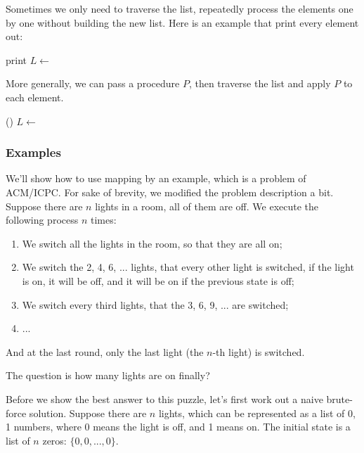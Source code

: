 \documentclass[b5paper]{article}
\begin{document}
Sometimes we only need to traverse the list, repeatedly process the elements one by one without building the new list. Here is an example that print every element out:

\begin{algorithmic}[1]
    \State print 
    \State $L \gets$ 
  \EndWhile
\EndFunction
\end{algorithmic}

More generally, we can pass a procedure $P$, then traverse the list and apply $P$ to each element.

\begin{algorithmic}[1]
    \State {}()
    \State $L \gets$ 
  \EndWhile
\EndFunction
\end{algorithmic}

\subsubsection{Examples}

We'll show how to use mapping by an example, which is a problem of ACM/ICPC\cite{poj-drunk-jailer}.
For sake of brevity, we modified the problem description a bit. Suppose there are $n$ lights in a room, all
of them are off. We execute the following process $n$ times:

\begin{enumerate}
\item We switch all the lights in the room, so that they are all on;
\item We switch the 2, 4, 6, ... lights, that every other light is switched, if the light is on, it will be off, and it will be
on if the previous state is off;
\item We switch every third lights, that the 3, 6, 9, ... are switched;
\item ...
\end{enumerate}

And at the last round, only the last light (the $n$-th light) is switched.

The question is how many lights are on finally?

Before we show the best answer to this puzzle, let's first work out a naive brute-force solution.
Suppose there are $n$ lights, which can be represented as a list of 0, 1 numbers, where 0 means the light
is off, and 1 means on. The initial state is a list of $n$ zeros: $\{0, 0, ..., 0\}$.
\end{document}
